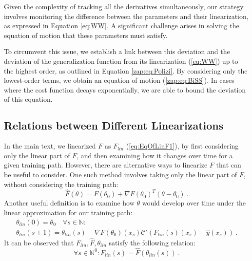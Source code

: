 \documentclass{article} %
\begin{document}
Given the complexity of tracking all the derivatives simultaneously, our strategy involves monitoring the difference between the parameters and their linearization, as expressed in \textcolor{black}{Equation} \ref{eq:WW}. A significant challenge arises in solving the equation of motion that these parameters must satisfy.

To circumvent this issue, we establish a link between this deviation and the deviation of the generalization function from its linearization (\ref{eq:WW}) up to the highest order, as outlined in \textcolor{black}{Equation} \ref{zap:eq:Polizi}. By considering only the lowest-order terms, we obtain an equation of motion (\ref{zap:eq:BiSS}). In cases where the cost function decays exponentially, we are able to bound the deviation of this equation.

\subsection{Relations between Different Linearizations}

In the main text, we linearized \(F\) as \(F_{lin}\) (\ref{eq:EqOfLinF1}), by first considering only the linear part of \(F\), and then examining how it changes over time for a given training path. However, there are alternative ways to linearize \(F\) that can be useful to consider. One such method involves taking only the linear part of \(F\), without considering the training path:
\begin{equation}
\hat{F}(\theta) = F\left(\theta_0\right) + \nabla F\left(\theta_{0}\right)^{T}\left(\theta - \theta_0\right) \ .
\label{eq:FHatLin}
\end{equation}
Another useful definition is to examine how \(\theta\) would develop over time under the linear approximation for our training path:
\begin{equation}
\label{zap:eq:theta}
\begin{array}{c}
\theta_{lin}\left(0\right) = \theta_{0}\quad\forall s \in\mathbb{N}:\\
\theta_{lin}\left(s+1\right) = \theta_{lin}\left(s\right) - \nabla F\left(\theta_{0}\right)\left(x_{s}\right)\mathcal{C}'\left(F_{lin}\left(s\right)\left(x_{s}\right) - \hat{y}\left(x_{s}\right)\right) \ .
\end{array}
\end{equation}
It can be observed that \(F_{lin}, \hat{F}, \theta_{lin}\) satisfy the following relation:
\begin{equation}
\forall s \in\mathbb{N}^{0}: F_{lin}\left(s\right) = \hat{F}\left(\theta_{lin}\left(s\right)\right) \ .
\end{equation}
\end{document}
